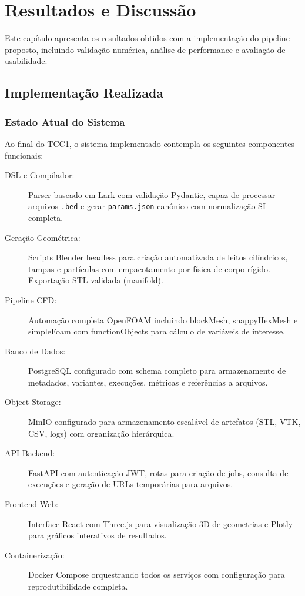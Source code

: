 \chapter{Resultados e Discussão}
\label{cap:resultados}

Este capítulo apresenta os resultados obtidos com a implementação do pipeline proposto, incluindo validação numérica, análise de performance e avaliação de usabilidade.

\section{Implementação Realizada}

\subsection{Estado Atual do Sistema}

Ao final do TCC1, o sistema implementado contempla os seguintes componentes funcionais:

\begin{description}
    \item[DSL e Compilador:] Parser baseado em Lark com validação Pydantic, capaz de processar arquivos \texttt{.bed} e gerar \texttt{params.json} canônico com normalização SI completa.
    
    \item[Geração Geométrica:] Scripts Blender headless para criação automatizada de leitos cilíndricos, tampas e partículas com empacotamento por física de corpo rígido. Exportação STL validada (manifold).
    
    \item[Pipeline CFD:] Automação completa OpenFOAM incluindo blockMesh, snappyHexMesh e simpleFoam com functionObjects para cálculo de variáveis de interesse.
    
    \item[Banco de Dados:] PostgreSQL configurado com schema completo para armazenamento de metadados, variantes, execuções, métricas e referências a arquivos.
    
    \item[Object Storage:] MinIO configurado para armazenamento escalável de artefatos (STL, VTK, CSV, logs) com organização hierárquica.
    
    \item[API Backend:] FastAPI com autenticação JWT, rotas para criação de jobs, consulta de execuções e geração de URLs temporárias para arquivos.
    
    \item[Frontend Web:] Interface React com Three.js para visualização 3D de geometrias e Plotly para gráficos interativos de resultados.
    
    \item[Containerização:] Docker Compose orquestrando todos os serviços com configuração para reprodutibilidade completa.
\end{description}

